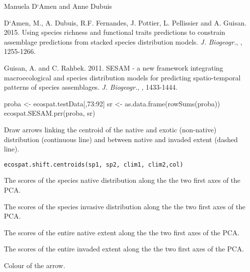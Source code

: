 \documentclass[a4paper]{book}
\begin{document}
%
\begin{Author}\relax
Manuela D`Amen  and Anne Dubuis 
\end{Author}
%
\begin{References}\relax
D`Amen, M., A. Dubuis, R.F. Fernandes, J. Pottier, L. Pellissier and A. Guisan. 2015. Using species richness and functional traits predictions to constrain assemblage predictions from stacked species distribution models. \emph{J. Biogeogr.}, , 1255-1266.

Guisan, A. and C. Rahbek. 2011. SESAM - a new framework integrating macroecological and species distribution models for predicting spatio-temporal patterns of species assemblages. \emph{J. Biogeogr.}, , 1433-1444.
\end{References}
%
\begin{Examples}
\begin{ExampleCode}
proba <- ecospat.testData[,73:92]
sr <- as.data.frame(rowSums(proba))
ecospat.SESAM.prr(proba, sr)

\end{ExampleCode}
\end{Examples}
%
\begin{Description}\relax
Draw arrows linking the centroid of the native and exotic (non-native) distribution (continuous line) and between native and invaded extent (dashed line).
\end{Description}
%
\begin{Usage}
\begin{verbatim}
ecospat.shift.centroids(sp1, sp2, clim1, clim2,col)
\end{verbatim}
\end{Usage}
%
\begin{Arguments}
\begin{ldescription}
\item[\code{sp1}] The scores of the species native distribution along the the two first axes of the PCA.
\item[\code{sp2}] The scores of the species invasive distribution along the the two first axes of the PCA.
\item[\code{clim1}] The scores of the entire native extent along the the two first axes of the PCA.
\item[\code{clim2}] The scores of the entire invaded extent along the the two first axes of the PCA.
\item[\code{col}] Colour of the arrow.
\end{ldescription}
\end{Arguments}
\end{document}
